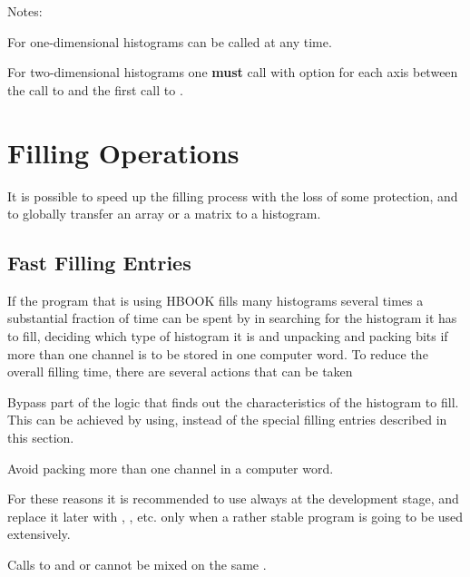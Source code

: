 Notes:
\begin{UL}
\item For one-dimensional histograms  can be called at any time.
\item For two-dimensional histograms one {\bf must} call 
      with option  for each axis between the call to 
      and the first call to .
\end{UL}


\section{Filling Operations}
\label{HOTHFILL}

It is possible to speed up the filling process with the loss 
of some protection,
and to globally transfer an array or a matrix to a histogram.

\subsection{Fast Filling Entries}
\label{HFASTFIL}
 
If the program that is using HBOOK fills many histograms several
times a substantial fraction of time can be spent by 
in searching for the histogram it has to fill, deciding which type
of histogram
it is and unpacking and packing bits if more than one channel is to
be stored in one computer word.
To reduce the overall filling time, there are several actions
that can be taken
 
\begin{UL}
\item Bypass part of the logic that finds out the characteristics
of the histogram to fill. This can be achieved by using,
instead of 
the special filling entries described in this section.
\item Avoid packing more than one channel in a computer word.
\end{UL}
 
For these reasons it is recommended to use always 
at the development stage, and replace it later with
, , etc. only when a rather 
stable program is going to be used extensively.
 
Calls to  and  or 
cannot be mixed on the same .
\medskip
 

